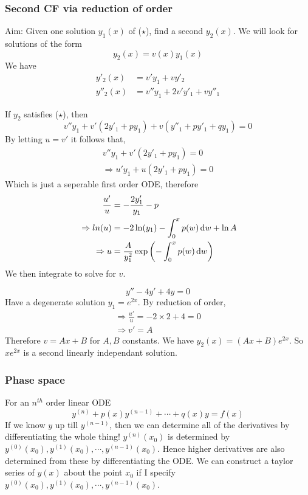 \documentclass{article}
\begin{document}
\subsubsection{Second CF via reduction of order}
Aim: Given one solution $y_1(x)$ of ($\star$), find a second $y_2(x)$.
We will look for solutions of the form
\[
    y_2(x) = v(x) y_1(x)
\]
We have
\begin{align*}
    y'_2(x) &= v'y_1 + vy'_2 \\
    y''_2(x) &= v''y_1 + 2v'y'_1 + vy''_1
\end{align*}

If $y_2$ satisfies ($\star$), then
\[
    v''y_1 + v' (2y'_1 + py_1) + v(y''_1 + p y'_1 + qy_1) = 0
\]
By letting $u = v'$ it follows that,
\begin{align*}
    v''y_1 + v' (2y'_1 + py_1) = 0 \\
    \Rightarrow u' y_1 + u(2y'_1 + py_1) = 0
\end{align*}
Which is just a seperable first order ODE, therefore
\begin{align*}
    \frac{u'}{u} &= -\frac{2 y'_1}{y_1} - p \\\
    \Rightarrow ln(u) &= -2 \ln(y_1) - \int_{0}^{x}{p(w) \mathop{}\!\mathrm{d} w} + \ln A \\
    \Rightarrow u &= \frac{A}{y_1^2} \exp \left( -\int_{0}^{x}{p(w) \mathop{}\!\mathrm{d} w} \right)
\end{align*}
We then integrate to solve for $v$.

\begin{eg}
    \[
        y'' - 4y' + 4y = 0  
    \]
    Have a degenerate solution $y_1 = e^{2x}$.
    By reduction of order,
    \begin{align*}
        \Rightarrow \frac{u'}{u} = -2 \times 2 + 4 = 0 \\
        \Rightarrow v' = A
    \end{align*}
    Therefore $v = Ax + B$ for $A, B$ constants.
    We have $y_2(x) = (Ax + B)e^{2x}$.
    So $xe^{2x}$ is a second linearly independant solution.
\end{eg}

\subsubsection{Phase space}
For an $n^{th}$ order linear ODE
\[
    y^{(n)} + p(x) y^{(n-1)} + \cdots + q(x)y = f(x)
\]
If we know $y$ up till $y^{(n-1)}$, then we can determine all of the derivatives by differentiating the whole thing!
$y^{(n)}(x_0)$ is determined by $y^{(0)}(x_0), y^{(1)}(x_0), \cdots, y^{(n-1)}(x_0)$. 
Hence higher derivatives are also determined from these by differentiating the ODE.
We can construct a taylor series of $y(x)$ about the point $x_0$ if I specify $y^{(0)}(x_0), y^{(1)}(x_0), \cdots, y^{(n-1)}(x_0)$.
\end{document}
